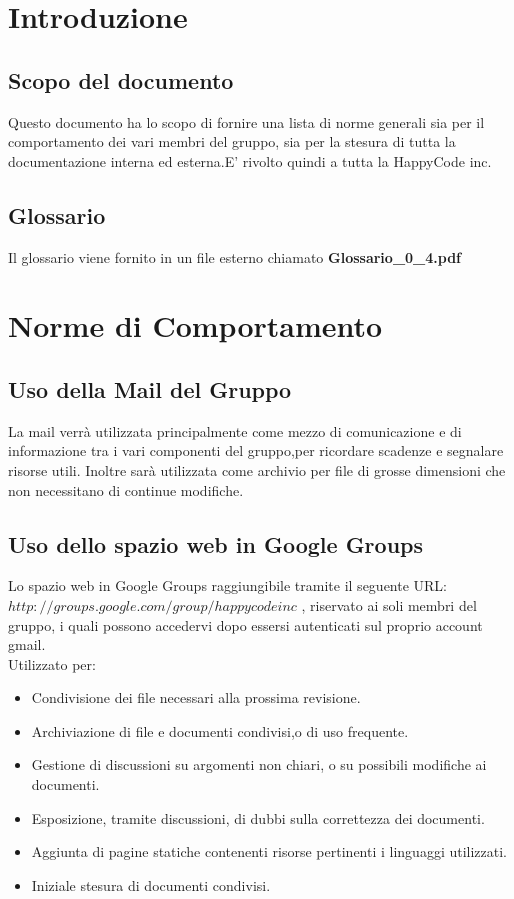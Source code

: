 \documentclass[11pt,titlepage,a4paper]{report}
\begin{document}
\tableofcontents %

\chapter{Introduzione}
\section{Scopo del documento}
Questo documento ha lo scopo di fornire una lista di norme
generali sia per il comportamento dei vari membri del gruppo,
sia per la stesura di tutta la documentazione interna
ed esterna.E' rivolto quindi a tutta la HappyCode inc.

\section{Glossario}
Il glossario viene fornito in un file esterno chiamato \textbf {Glossario\_0\_4.pdf} 

\chapter{Norme di Comportamento}
\section{Uso della Mail del Gruppo}
	La mail verr\`a utilizzata principalmente come mezzo di comunicazione 
	e di informazione tra i vari componenti del gruppo,per ricordare scadenze e  segnalare risorse utili.
	Inoltre sar\`a utilizzata come archivio per file di grosse dimensioni
	che non necessitano di continue modifiche.

\section{Uso dello spazio web in Google Groups}
	Lo spazio web in Google Groups raggiungibile tramite il seguente URL: \({http://groups.google.com/group/happycodeinc}\)
	, riservato ai soli membri del gruppo, i quali possono accedervi 
 dopo essersi autenticati sul proprio account gmail.\\
	Utilizzato per:
	\begin{itemize}
	\item Condivisione dei file necessari alla prossima revisione.
	\item Archiviazione di file e documenti condivisi,o di uso frequente.
	\item Gestione di discussioni su argomenti non chiari, o su possibili modifiche ai documenti.
	\item Esposizione, tramite discussioni, di dubbi sulla correttezza dei documenti.
	\item Aggiunta di pagine statiche contenenti risorse pertinenti i linguaggi utilizzati.
	\item Iniziale stesura di documenti condivisi. 
\end{itemize}
\end{document}
